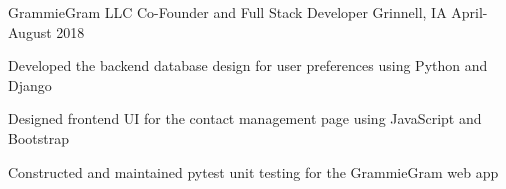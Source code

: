 \documentclass[11pt, a4paper]{awesome-cv}
\begin{document}
\begin{cventries}
  \cventry
    {GrammieGram LLC}
    {Co-Founder and Full Stack Developer}
    {Grinnell, IA}
    {April-August 2018}
    {
      \begin{cvitems}
        \item {Developed the backend database design for user preferences using Python and Django}
        \item {Designed frontend UI for the contact management page using JavaScript and Bootstrap}
        \item {Constructed and maintained pytest unit testing for the GrammieGram web app}
      \end{cvitems}
    }

\end{cventries}
\end{document}
